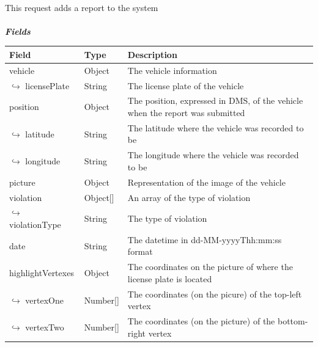 						\paragraph{}
						\vspace{-7.5mm}
						This request adds a report to the system
						\paragraph{}
							\textcolor{myBlue}{\textit{\textbf{Fields}}}
							\vspace{-2mm}
							\begin{table}[!h]
								\begin{tabular}{L{0.3\textwidth}L{0.15\textwidth}L{0.43\textwidth}}
									\toprule
									\textbf{Field} & \textbf{Type} & \textbf{Description} \\
									\midrule
								 	vehicle & Object & The vehicle information \\
								 	\hspace{2.5mm}$\hookrightarrow$ licensePlate & String & The license plate of the vehicle \\
								 	position & Object & The position, expressed in DMS, of the vehicle when the report was submitted  \\
								 	\hspace{2.5mm}$\hookrightarrow$ latitude & String & The latitude where the vehicle was recorded to be \\
								 	\hspace{2.5mm}$\hookrightarrow$ longitude & String & The longitude where the vehicle was recorded to be \\
								 	picture & Object & Representation of the image of the vehicle \\
								 	violation & Object[] & An array of the type of violation \\
								 	\hspace{2.5mm}$\hookrightarrow$ violationType & String & The type of violation \\
								 	date & String & The datetime in \newline dd-MM-yyyyThh:mm:ss format \\
								 	highlightVertexes & Object & The coordinates on the picture of where the license plate is located \\
								 	\hspace{2.5mm}$\hookrightarrow$ vertexOne & Number[] & The coordinates (on the picure) of the top-left vertex \\
								 	\hspace{2.5mm}$\hookrightarrow$ vertexTwo & Number[] & The coordinates (on the picture) of the bottom-right vertex \\
								 	\bottomrule
								\end{tabular}
							\end{table}
